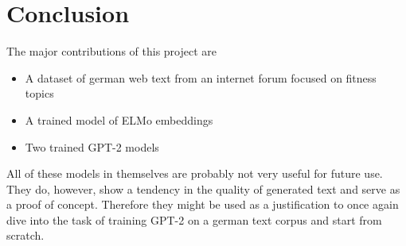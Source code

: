 \documentclass{scrartcl}
\begin{document}
\section{Conclusion}

The major contributions of this project are 
\begin{itemize}
	\item A dataset of german web text from an internet forum focused on fitness topics
	\item A trained model of ELMo embeddings
	\item Two trained GPT-2 models
\end{itemize}

All of these models in themselves are probably not very useful for future use. They do, however, show a tendency in the quality of generated text and serve as a proof of concept. Therefore they might be used as a justification to once again dive into the task of training GPT-2 on a german text corpus and start from scratch.

 
%
%
%

\printbibliography
\end{document}
